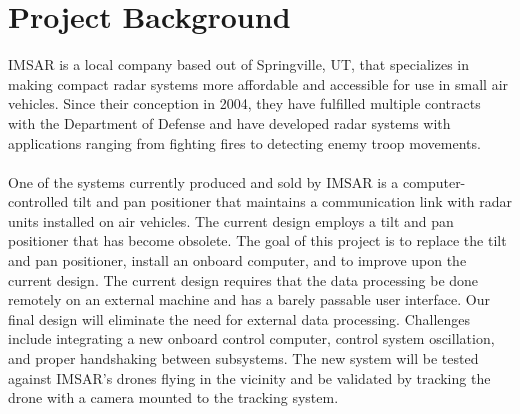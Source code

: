 \chapter{Project Background}

IMSAR is a local company based out of Springville, UT, that specializes in making compact radar systems more affordable and accessible for use in small air vehicles. Since their conception in 2004, they have fulfilled multiple contracts with the Department of Defense and have developed radar systems with applications ranging from fighting fires to detecting enemy troop movements.
~\\~\\
One of the systems currently produced and sold by IMSAR is a computer-controlled tilt and pan positioner that maintains a communication link with radar units installed on air vehicles. The current design employs a tilt and pan positioner that has become obsolete. The goal of this project is to replace the tilt and pan positioner, install an onboard computer, and to improve upon the current design. The current design requires that the data processing be done remotely on an external machine and has a barely passable user interface. Our final design will eliminate the need for external data processing. Challenges include integrating a new onboard control computer, control system oscillation, and proper handshaking between subsystems. The new system will be tested against IMSAR's drones flying in the vicinity and be validated by tracking the drone with a camera mounted to the tracking system.
\clearpage
